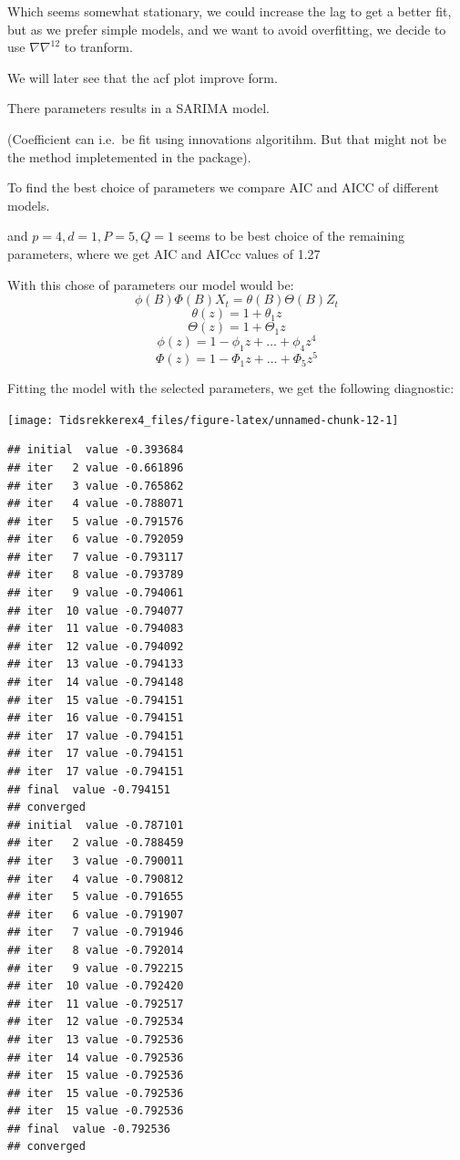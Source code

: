 \documentclass[]{article}
\begin{document}
Which seems somewhat stationary, we could increase the lag to get a
better fit, but as we prefer simple models, and we want to avoid
overfitting, we decide to use \(\nabla\nabla^{12}\) to tranform.

We will later see that the acf plot improve form.

There parameters results in a SARIMA model.

(Coefficient can i.e.~be fit using innovations algoritihm. But that
might not be the method impletemented in the package).

To find the best choice of parameters we compare AIC and AICC of
different models.

and \(p=4, d=1, P=5, Q=1\) seems to be best choice of the remaining
parameters, where we get AIC and AICcc values of 1.27

With this chose of parameters our model would be:
\[\phi(B)\Phi(B)X_t = \theta(B)\Theta(B)Z_ t\] \[\theta(z)=1+\theta_1z\]
\[\Theta(z)=1+\Theta_1z\] \[\phi(z)=1-\phi_1z+\dots+\phi_ 4z^4\]
\[\Phi(z)=1-\Phi_1z+\dots+\Phi_5z^5\]

Fitting the model with the selected parameters, we get the following
diagnostic:

\begin{center}\texttt{[image: Tidsrekkerex4\_files/figure-latex/unnamed-chunk-12-1]} \end{center}

\begin{verbatim}
## initial  value -0.393684 
## iter   2 value -0.661896
## iter   3 value -0.765862
## iter   4 value -0.788071
## iter   5 value -0.791576
## iter   6 value -0.792059
## iter   7 value -0.793117
## iter   8 value -0.793789
## iter   9 value -0.794061
## iter  10 value -0.794077
## iter  11 value -0.794083
## iter  12 value -0.794092
## iter  13 value -0.794133
## iter  14 value -0.794148
## iter  15 value -0.794151
## iter  16 value -0.794151
## iter  17 value -0.794151
## iter  17 value -0.794151
## iter  17 value -0.794151
## final  value -0.794151 
## converged
## initial  value -0.787101 
## iter   2 value -0.788459
## iter   3 value -0.790011
## iter   4 value -0.790812
## iter   5 value -0.791655
## iter   6 value -0.791907
## iter   7 value -0.791946
## iter   8 value -0.792014
## iter   9 value -0.792215
## iter  10 value -0.792420
## iter  11 value -0.792517
## iter  12 value -0.792534
## iter  13 value -0.792536
## iter  14 value -0.792536
## iter  15 value -0.792536
## iter  15 value -0.792536
## iter  15 value -0.792536
## final  value -0.792536 
## converged
\end{verbatim}
\end{document}
